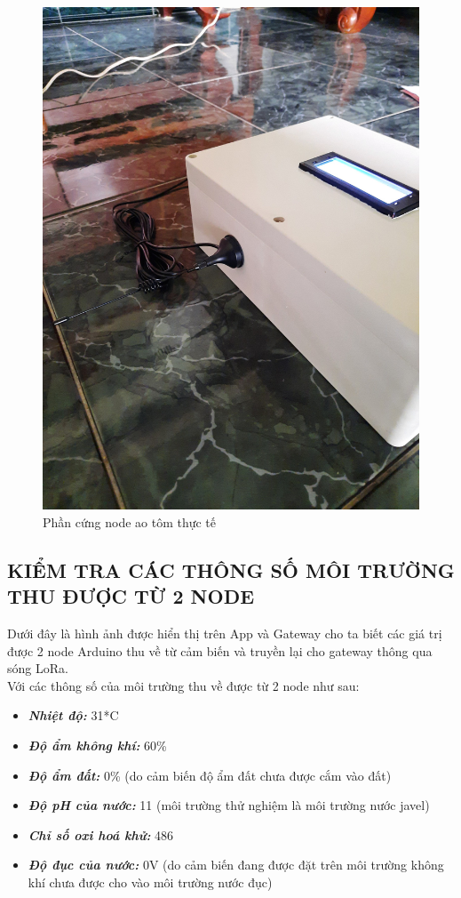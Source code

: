 \begin{figure}[H]
	\centering
	\includegraphics[scale=0.1]{Chapter 4/image chapter 4/antenAotom.jpg}
	\caption[Phần cứng node ao tôm thực tế]{Phần cứng node ao tôm thực tế}
\end{figure}
\subsection{KIỂM TRA CÁC THÔNG SỐ MÔI TRƯỜNG THU ĐƯỢC TỪ 2 NODE}
Dưới đây là hình ảnh được hiển thị trên App và Gateway cho ta biết các giá trị được 2 node Arduino thu về từ cảm biến và truyền lại cho gateway thông qua sóng LoRa.\\
\indent Với các thông số của môi trường thu về được từ 2 node như sau:
\begin{itemize}
	\item \textbf{\textit{Nhiệt độ: }} 31*C
	\item \textbf{\textit{Độ ẩm không khí: }} 60\%
	\item \textbf{\textit{Độ ẩm đất: }} 0\% (do cảm biến độ ẩm đất chưa được cắm vào đất)
	\item \textbf{\textit{Độ pH của nước: }} 11 (môi trường thử nghiệm là môi trường nước javel)
	\item \textbf{\textit{Chỉ số oxi hoá khử: }} 486
	\item \textbf{\textit{Độ đục của nước: }} 0V (do cảm biến đang được đặt trên môi trường không khí chưa được cho vào môi trường nước đục)
\end{itemize}

